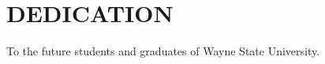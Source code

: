 \section*{DEDICATION}

\begin{center}
	To the future students and graduates of Wayne State University.
\end{center}
